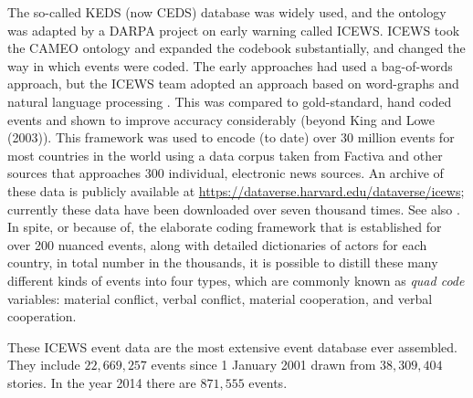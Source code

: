 \documentclass[12pt,oneside,doublespace,pdflatex]{amsart}
\begin{document}
The so-called KEDS (now CEDS) database was widely used, and the ontology was adapted by a DARPA project on 
early warning called ICEWS.  ICEWS took the CAMEO ontology and expanded the codebook substantially, and changed the way in which events were coded. The early approaches had used a bag-of-words approach, but the ICEWS team adopted
an approach based on word-graphs and natural language processing \citep{boschee:natarajan:etal:2013}. This was compared to gold-standard, hand coded events and shown to improve accuracy considerably (beyond King and Lowe (2003)). This framework was used to encode (to date) over 30 million events for most countries in the world using a data corpus taken from Factiva and other sources that approaches 300 individual, electronic news sources. An archive of these data is publicly available at \url{https://dataverse.harvard.edu/dataverse/icews}; currently these data have been downloaded over seven thousand times. See also 
\citet{icews:2015:aggregations,icews:2015:data,ramshaw:etal:2011}.  In spite, or because of, the elaborate coding framework that is established for over 200 nuanced events, along with detailed dictionaries of actors for each country, in total number in the thousands, it is possible to distill these many different kinds of events into four types, which are commonly known as {\em quad code} variables: material conflict, verbal conflict, material cooperation, and verbal cooperation.

These ICEWS event data are the most extensive event database ever assembled. They include $22,669,257$ events since 1 January 2001 drawn from $38,309,404$ stories. In the year 2014 there are $871,555$ events.
\end{document}

